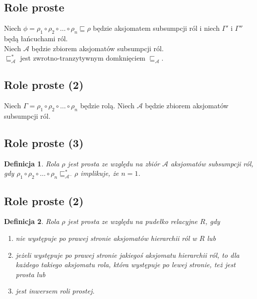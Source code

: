 \documentclass[12pt]{article}
\newtheorem{definicja}{Definicja}
\begin{document}
\subsection{Role proste}
%
Niech $\phi=\rho_{1} \circ \rho_{2} \circ \dots \circ \rho_{n} \sqsubseteq \rho$ będzie aksjomatem subsumpcji ról i niech $\Gamma'$ i $\Gamma''$ będą łańcuchami ról. %
%
\\
Niech $\mathcal{A}$ będzie zbiorem aksjomatów subsumpcji ról. %
%
\\
$\sqsubseteq_{\mathcal{A}}^{*}$ jest zwrotno-tranzytywnym domknięciem $\sqsubseteq_{\mathcal{A}}$.
%

\subsection{Role proste (2)}
%
Niech $\Gamma = \rho_{1} \circ \rho_{2} \circ \dots \circ \rho_{n}$ będzie rolą. %
%
Niech $\mathcal{A}$ będzie zbiorem aksjomatów subsumpcji ról. %
%

\subsection{Role proste (3)}
%
\begin{definicja}
Rola $\rho$ jest prosta ze względu na zbiór  $\mathcal{A}$ aksjomatów subsumpcji ról, gdy $\rho_{1} \circ \rho_{2} \circ \dots \circ \rho_{n} \sqsubseteq_{\mathcal{A}^{-}}^{*} \rho$ implikuje, że $n=1$.
\end{definicja}
%

\subsection{Role proste (2)}
%
\begin{definicja}
Rola $\rho$ jest \emph{prosta} ze względu na pudełko relacyjne $R$, gdy
\begin{enumerate}
	\item nie występuje po prawej stronie aksjomatów hierarchii ról w $R$ lub
	\item jeżeli występuje po prawej stronie jakiegoś aksjomatu hierarchii ról, to dla każdego takiego aksjomatu rola, która występuje po lewej stronie, też jest prosta lub
	\item jest inwersem roli prostej.
\end{enumerate}
\end{definicja}
%
\end{document}
